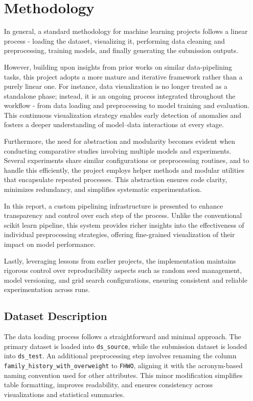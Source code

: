\chapter{Methodology}\label{ch:methodology}


In general, a standard methodology for machine learning projects follows a linear process - loading the dataset, visualizing it, performing data cleaning and preprocessing, training models, and finally generating the submission outputs.

However, building upon insights from prior works on similar data-pipelining tasks, this project adopts a more mature and iterative framework rather than a purely linear one.
For instance, data visualization is no longer treated as a standalone phase; instead, it is an ongoing process integrated throughout the workflow - from data loading and preprocessing to model training and evaluation.
This continuous visualization strategy enables early detection of anomalies and fosters a deeper understanding of model–data interactions at every stage.

Furthermore, the need for abstraction and modularity becomes evident when conducting comparative studies involving multiple models and experiments.
Several experiments share similar configurations or preprocessing routines, and to handle this efficiently, the project employs helper methods and modular utilities that encapsulate repeated processes.
This abstraction ensures code clarity, minimizes redundancy, and simplifies systematic experimentation.

In this report, a custom pipelining infrastructure is presented to enhance transparency and control over each step of the process.
Unlike the conventional scikit learn pipeline, this system provides richer insights into the effectiveness of individual preprocessing strategies, offering fine-grained visualization of their impact on model performance.

Lastly, leveraging lessons from earlier projects, the implementation maintains rigorous control over reproducibility aspects such as random seed management, model versioning, and grid search configurations, ensuring consistent and reliable experimentation across runs.



\section{Dataset Description}\label{sec:dataset-description}
The data loading process follows a straightforward and minimal approach.
The primary dataset is loaded into \texttt{ds\_source}, while the submission dataset is loaded into \texttt{ds\_test}.  
An additional preprocessing step involves renaming the column \texttt{family\_history\_with\_overweight} to \texttt{FHWO}, aligning it with the acronym-based naming convention used for other attributes.  
This minor modification simplifies table formatting, improves readability, and ensures consistency across visualizations and statistical summaries.


